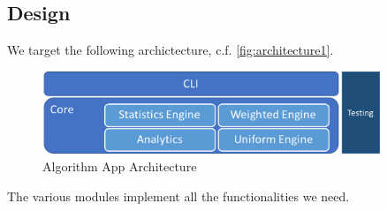 \documentclass[12pt,a4paper,titlepage]{article}
\begin{document}
\subsection{Design}
\label{ssec:design}
We target the following archictecture, c.f. \autoref{fig:architecture1}.
\begin{figure}[h!]
\begin{center}
\includegraphics[width=0.9\textwidth]{img/architecture1.png}
\caption{Algorithm App Architecture}
\label{fig:architecture1}
\end{center}
\end{figure}
The various modules implement all the functionalities we need.
\end{document}
